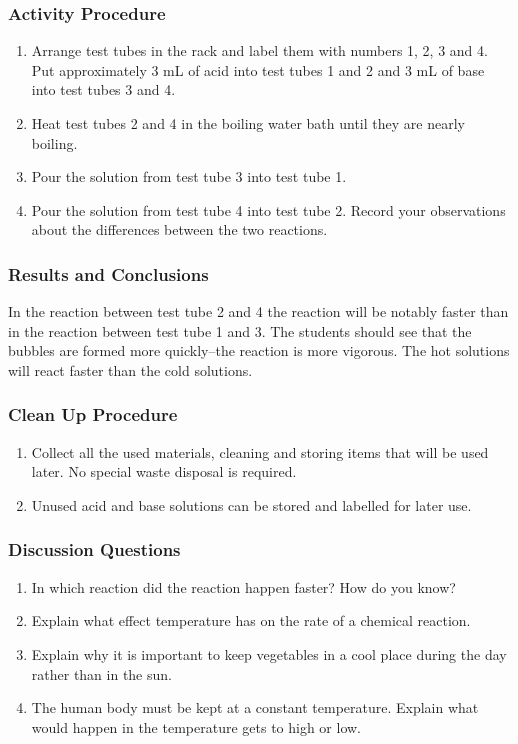 \subsubsection*{Activity Procedure}
\begin{enumerate}
\item{Arrange test tubes in the rack and label them with numbers 1, 2, 3 and 4. Put approximately 3 mL of acid into test tubes 1 and 2 and 3 mL of base into test tubes 3 and 4.}
\item{Heat test tubes 2 and 4 in the boiling water bath until they are nearly boiling.}
\item{Pour the solution from test tube 3 into test tube 1.}
\item{Pour the solution from test tube 4 into test tube 2. Record your observations about the differences between the two reactions.}
\end{enumerate}

\subsubsection*{Results and Conclusions}
In the reaction between test tube 2 and 4 the reaction will be notably faster than in the reaction between test tube 1 and 3. The students should see that the bubbles are formed more quickly--the reaction is more vigorous. The hot solutions will react faster than the cold solutions.

\subsubsection*{Clean Up Procedure}
\begin{enumerate}
\item{Collect all the used materials, cleaning and storing items that will be used later. No special waste disposal is required.}
\item{Unused acid and base solutions can be stored and labelled for later use.}
\end{enumerate}

\subsubsection*{Discussion Questions}
\begin{enumerate}
\item{In which reaction did the reaction happen faster? How do you know?}
\item{Explain what effect temperature has on the rate of a chemical reaction.}
\item{Explain why it is important to keep vegetables in a cool place during the day rather than in the sun.}
\item{The human body must be kept at a constant temperature. Explain what would happen in the temperature gets to high or low.}
\end{enumerate}

